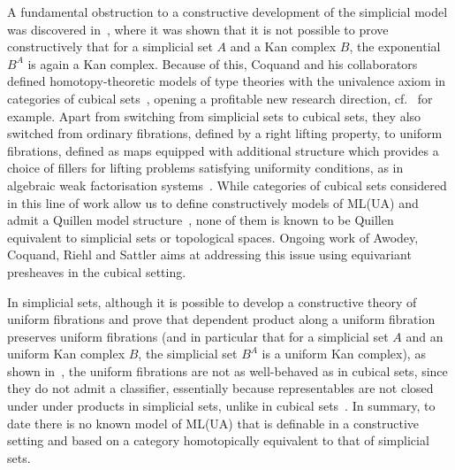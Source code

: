 \documentclass[reqno,10pt,a4paper,oneside,draft]{amsart}
\numberwithin{equation}{section}
\theoremstyle{mythm}
\theoremstyle{mydef}
\theoremstyle{myrmk}
\begin{document}
A fundamental obstruction to a constructive development of  the simplicial model was discovered in~\cite{coquand-non-constructivity-kan}, where it was shown that
it is not possible to prove constructively that for a simplicial set $A$ and a
Kan complex $B$, the exponential~$B^A$ is again a Kan complex.
Because of this, Coquand and his collaborators  defined homotopy-theoretic models of type
theories with the univalence axiom in categories of cubical sets~\cite{coquand-cubical-sets}, opening a profitable new research direction, cf.~\cite{awodey-cubical,cohen-et-al:cubicaltt,PittsAM:aximct} for example. Apart from switching 
from simplicial sets to cubical sets, they also switched from ordinary fibrations, defined by a right lifting property,
to uniform fibrations, defined as maps equipped with additional structure which 
 provides a choice of fillers for lifting problems satisfying uniformity conditions, as in algebraic weak factorisation systems~\cite{garner:small-object-argument,grandis-tholen-nwfs}. While 
categories of cubical sets considered in this line of work allow us to define constructively models of 
ML(UA) and admit a Quillen
model structure~\cite{SattlerC:equepu}, none of them
 is known to be Quillen equivalent to simplicial sets or topological spaces. Ongoing work of Awodey, Coquand, Riehl and Sattler  aims at addressing this issue 
 using equivariant presheaves in the cubical setting.

In simplicial sets, although it is possible to develop  a constructive theory of uniform fibrations and prove that dependent product along a uniform fibration preserves
uniform fibrations (and in particular that for a simplicial set $A$ and an 
uniform Kan complex $B$, the simplicial set $B^A$ is a uniform Kan complex),
  as shown in~\cite{gambino2017frobenius}, the uniform fibrations
are not as well-behaved as in cubical sets,
since they do not admit a classifier, essentially because 
representables are not closed under under products in simplicial sets, unlike in cubical sets~\cite{SattlerC:faiaut}. 
In summary, to date there is no known model of ML(UA) that is definable in a constructive setting and
based on a category homotopically equivalent to that of simplicial sets. 

\smallskip
\end{document}
